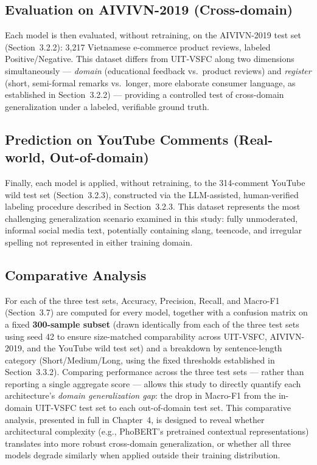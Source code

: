 \documentclass[12pt]{report} %
\begin{document}
\subsection{Evaluation on AIVIVN-2019 (Cross-domain)}
Each model is then evaluated, without retraining, on the AIVIVN-2019 test set (Section~3.2.2): 3,217 Vietnamese e-commerce product reviews, labeled Positive/Negative. This dataset differs from UIT-VSFC along two dimensions simultaneously --- \textit{domain} (educational feedback vs.\ product reviews) and \textit{register} (short, semi-formal remarks vs.\ longer, more elaborate consumer language, as established in Section~3.2.2) --- providing a controlled test of cross-domain generalization under a labeled, verifiable ground truth.

\subsection{Prediction on YouTube Comments (Real-world, Out-of-domain)}
Finally, each model is applied, without retraining, to the 314-comment YouTube wild test set (Section~3.2.3), constructed via the LLM-assisted, human-verified labeling procedure described in Section~3.2.3. This dataset represents the most challenging generalization scenario examined in this study: fully unmoderated, informal social media text, potentially containing slang, teencode, and irregular spelling not represented in either training domain.

\subsection{Comparative Analysis}
For each of the three test sets, Accuracy, Precision, Recall, and Macro-F1 (Section~3.7) are computed for every model, together with a confusion matrix on a fixed \textbf{300-sample subset} (drawn identically from each of the three test sets using seed 42 to ensure size-matched comparability across UIT-VSFC, AIVIVN-2019, and the YouTube wild test set) and a breakdown by sentence-length category (Short/Medium/Long, using the fixed thresholds established in Section~3.3.2). Comparing performance across the three test sets --- rather than reporting a single aggregate score --- allows this study to directly quantify each architecture's \textit{domain generalization gap}: the drop in Macro-F1 from the in-domain UIT-VSFC test set to each out-of-domain test set. This comparative analysis, presented in full in Chapter~4, is designed to reveal whether architectural complexity (e.g., PhoBERT's pretrained contextual representations) translates into more robust cross-domain generalization, or whether all three models degrade similarly when applied outside their training distribution.
\end{document}
